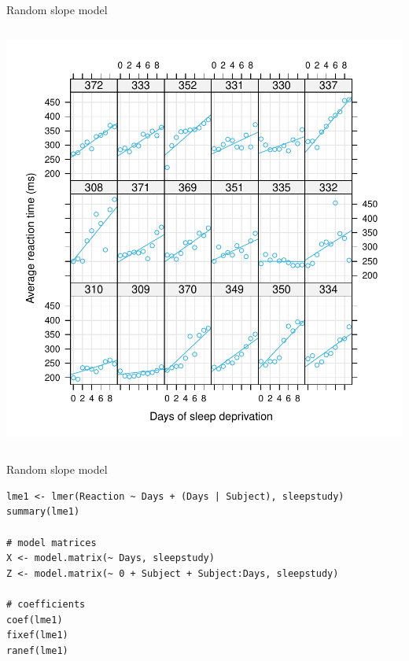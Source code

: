 \documentclass[aspectratio=169]{beamer}
\begin{document}
\begin{frame}[fragile]{Random slope model}
\begin{columns}
\begin{column}{.5\textwidth}
      \includegraphics[scale=.5]{../figures/sleep_random_slope}
    \end{column}
  \end{columns}
\end{frame}

\begin{frame}[fragile]{Random slope model}
\begin{lstlisting}
lme1 <- lmer(Reaction ~ Days + (Days | Subject), sleepstudy)
summary(lme1)

# model matrices
X <- model.matrix(~ Days, sleepstudy)
Z <- model.matrix(~ 0 + Subject + Subject:Days, sleepstudy)

# coefficients
coef(lme1)
fixef(lme1)
ranef(lme1)
\end{lstlisting}
\end{frame}
\end{document}

